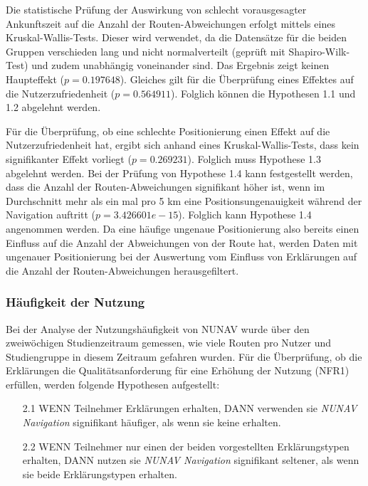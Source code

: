 Die statistische Prüfung der Auswirkung von schlecht vorausgesagter Ankunftszeit auf die Anzahl der Routen-Abweichungen erfolgt mittels eines Kruskal-Wallis-Tests. Dieser wird verwendet, da die Datensätze für die beiden Gruppen verschieden lang und nicht normalverteilt (geprüft mit Shapiro-Wilk-Test) und zudem unabhängig voneinander sind. Das Ergebnis zeigt keinen Haupteffekt ($ p = 0.197648 $). Gleiches gilt für die Überprüfung eines Effektes auf die Nutzerzufriedenheit ($ p = 0.564911 $). Folglich können die Hypothesen 1.1 und 1.2 abgelehnt werden.

Für die Überprüfung, ob eine schlechte Positionierung einen Effekt auf die Nutzerzufriedenheit hat, ergibt sich anhand eines Kruskal-Wallis-Tests, dass kein signifikanter Effekt vorliegt ($ p = 0.269231 $). Folglich muss Hypothese 1.3 abgelehnt werden. Bei der Prüfung von Hypothese 1.4 kann festgestellt werden, dass die Anzahl der Routen-Abweichungen signifikant höher ist, wenn im Durchschnitt mehr als ein mal pro 5 km eine Positionsungenauigkeit während der Navigation auftritt ($ p = 3.426601e-15 $). Folglich kann Hypothese 1.4 angenommen werden. Da eine häufige ungenaue Positionierung also bereits einen Einfluss auf die Anzahl der Abweichungen von der Route hat, werden Daten mit ungenauer Positionierung bei der Auswertung vom Einfluss von Erklärungen auf die Anzahl der Routen-Abweichungen herausgefiltert.

\subsubsection{Häufigkeit der Nutzung}
\label{sec:06_model_evaluation:usage_analysis}

Bei der Analyse der Nutzungshäufigkeit von NUNAV wurde über den zweiwöchigen Studienzeitraum gemessen, wie viele Routen pro Nutzer und Studiengruppe in diesem Zeitraum gefahren wurden. Für die Überprüfung, ob die Erklärungen die Qualitätsanforderung für eine Erhöhung der Nutzung (NFR1) erfüllen, werden folgende Hypothesen aufgestellt:

\begin{enumerate}
    \item[2.1] WENN Teilnehmer Erklärungen erhalten, DANN verwenden sie \textit{NUNAV Navigation} signifikant häufiger, als wenn sie keine erhalten.
    \item[2.2] WENN Teilnehmer nur einen der beiden vorgestellten Erklärungstypen erhalten, DANN nutzen sie \textit{NUNAV Navigation} signifikant seltener, als wenn sie beide Erklärungstypen erhalten.
\end{enumerate}


